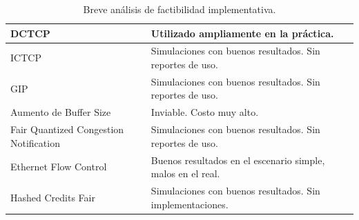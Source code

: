 \documentclass[runningheads,a4paper]{llncs}
\begin{document}
\begin{table}[]
{\begin{tabular}{@{}ll@{}}
DCTCP \cite{Alizadeh_DCTCP_2010}                                  & Utilizado ampliamente en la práctica.                                   \\ \midrule
ICTCP \cite{Wu_ICTCP_2010}                                  & Simulaciones con buenos resultados. Sin reportes de uso.                \\ \midrule
GIP \cite{Zhang_GIP_2013}                                    & Simulaciones con buenos resultados. Sin reportes de uso.                \\ \midrule
Aumento de Buffer Size \cite{Phanishayee_Throughput_2008} \cite{Kulkarni_Probabilistic_2011}                 & Inviable. Costo muy alto.                                               \\ \midrule
Fair Quantized Congestion Notification \cite{Zhang_QCN_2011} & Simulaciones con buenos resultados. Sin reportes de uso.                \\ \midrule
Ethernet Flow Control \cite{Phanishayee_Throughput_2008}                  & Buenos resultados en el escenario simple, malos en el real.             \\ \midrule
Hashed Credits Fair \cite{Shpiner_HCF_2010}                    & Simulaciones con buenos resultados. Sin implementaciones.               \\ \bottomrule
\end{tabular}%
}
\caption{Breve análisis de factibilidad implementativa.}
\label{table:technical-feasibility}
\end{table}
\end{document}
